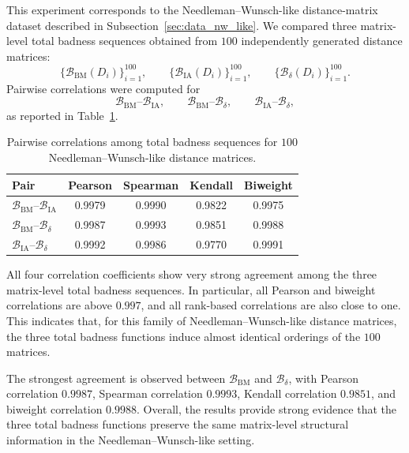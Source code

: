 \documentclass[11pt]{article}
\begin{document}
This experiment corresponds to the Needleman--Wunsch-like distance-matrix dataset described in Subsection~\ref{sec:data_nw_like}. We compared three matrix-level total badness sequences obtained from \(100\) independently generated distance matrices:
\[
\{\mathcal{B}_{\mathrm{BM}}(D_i)\}_{i=1}^{100},\qquad
\{\mathcal{B}_{\mathrm{IA}}(D_i)\}_{i=1}^{100},\qquad
\{\mathcal{B}_{\delta}(D_i)\}_{i=1}^{100}.
\]
Pairwise correlations were computed for
\[
\mathcal{B}_{\mathrm{BM}}\text{--}\mathcal{B}_{\mathrm{IA}},\qquad
\mathcal{B}_{\mathrm{BM}}\text{--}\mathcal{B}_{\delta},\qquad
\mathcal{B}_{\mathrm{IA}}\text{--}\mathcal{B}_{\delta},
\]
as reported in Table~\ref{tab:nw_like_total_badness_corr}.

\begin{table}[h!]
\centering
\caption{Pairwise correlations among total badness sequences for \(100\) Needleman--Wunsch-like distance matrices.}
\label{tab:nw_like_total_badness_corr}
\small
\setlength{\tabcolsep}{7pt}
\begin{tabular}{lcccc}
\hline
Pair & Pearson & Spearman & Kendall & Biweight \\
\hline
\(\mathcal{B}_{\mathrm{BM}}\)--\(\mathcal{B}_{\mathrm{IA}}\)     & 0.9979 & 0.9990 & 0.9822 & 0.9975 \\
\(\mathcal{B}_{\mathrm{BM}}\)--\(\mathcal{B}_{\delta}\)          & 0.9987 & 0.9993 & 0.9851 & 0.9988 \\
\(\mathcal{B}_{\mathrm{IA}}\)--\(\mathcal{B}_{\delta}\)          & 0.9992 & 0.9986 & 0.9770 & 0.9991 \\
\hline
\end{tabular}
\end{table}

All four correlation coefficients show very strong agreement among the three matrix-level total badness sequences. In particular, all Pearson and biweight correlations are above \(0.997\), and all rank-based correlations are also close to one. This indicates that, for this family of Needleman--Wunsch-like distance matrices, the three total badness functions induce almost identical orderings of the \(100\) matrices.

The strongest agreement is observed between \(\mathcal{B}_{\mathrm{BM}}\) and \(\mathcal{B}_{\delta}\), with Pearson correlation \(0.9987\), Spearman correlation \(0.9993\), Kendall correlation \(0.9851\), and biweight correlation \(0.9988\). Overall, the results provide strong evidence that the three total badness functions preserve the same matrix-level structural information in the Needleman--Wunsch-like setting.
\end{document}
